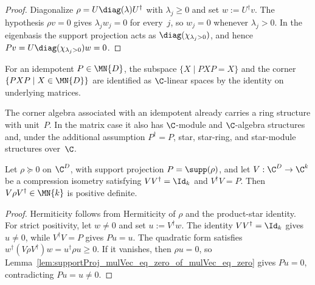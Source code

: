 \begin{proof}\leanok
    Diagonalize $\rho=U\diag(\lambda)U^\dagger$ with $\lambda_j\geq0$ and
    set $w:=U^\dagger v$. The hypothesis $\rho v=0$ gives
    $\lambda_jw_j=0$ for every~$j$, so $w_j=0$ whenever $\lambda_j>0$.
    In the eigenbasis the support projection acts as
    $\diag(\chi_{\lambda_j>0})$, and hence
    $Pv=U\diag(\chi_{\lambda_j>0})w=0$.
\end{proof}

\begin{definition}%
    \label{def:cornerSubmoduleCornerEquiv}
    \leanok
    For an idempotent $P\in\MN{D}$, the subspace
    $\{X\mid PXP=X\}$ and the corner
    $\{PXP\mid X\in\MN{D}\}$ are identified as $\C$-linear spaces by the
    identity on underlying matrices.
\end{definition}

\begin{remark}%
    \label{rem:corner_algebra_star_instances}
    \leanok
    The corner algebra associated with an idempotent already carries a ring
    structure with unit~$P$. In the matrix case it also has
    $\C$-module and $\C$-algebra structures and, under the additional
    assumption $P^\dagger=P$, star, star-ring, and star-module structures
    over~$\C$.
\end{remark}

\begin{theorem}%
    \label{thm:compression_on_support_posDef}
    \leanok
    Let $\rho\succeq0$ on $\C^D$, with support projection
    $P=\supp(\rho)$, and let $V:\C^D\to\C^k$ be a compression isometry
    satisfying $VV^\dagger=\Id_k$ and $V^\dagger V=P$. Then
    $V\rho V^\dagger\in\MN{k}$ is positive definite.
\end{theorem}

\begin{proof}\leanok
    Hermiticity follows from Hermiticity of $\rho$ and the product-star
    identity. For strict positivity, let $w\neq0$ and set $u:=V^\dagger w$.
    The identity $VV^\dagger=\Id_k$ gives $u\neq0$, while
    $V^\dagger V=P$ gives $Pu=u$. The quadratic form satisfies
    $w^\dagger(V\rho V^\dagger)w=u^\dagger\rho u\geq0$. If it vanishes,
    then $\rho u=0$, so
    Lemma~\ref{lem:supportProj_mulVec_eq_zero_of_mulVec_eq_zero} gives
    $Pu=0$, contradicting $Pu=u\neq0$.
\end{proof}

